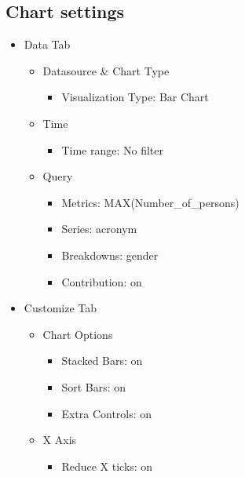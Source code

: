 \documentclass[
]{book}
\providecommand{\tightlist}{%
  \setlength{\itemsep}{0pt}\setlength{\parskip}{0pt}}
\begin{document}
\hypertarget{chart-settings-11}{%
\subsection{Chart settings}\label{chart-settings-11}}

\begin{itemize}
\item
  Data Tab

  \begin{itemize}
  \item
    Datasource \& Chart Type

    \begin{itemize}
    \tightlist
    \item
      Visualization Type: Bar Chart
    \end{itemize}
  \item
    Time

    \begin{itemize}
    \tightlist
    \item
      Time range: No filter
    \end{itemize}
  \item
    Query

    \begin{itemize}
    \item
      Metrics: MAX(Number\_of\_persons)
    \item
      Series: acronym
    \item
      Breakdowns: gender
    \item
      Contribution: on
    \end{itemize}
  \end{itemize}
\item
  Customize Tab

  \begin{itemize}
  \item
    Chart Options

    \begin{itemize}
    \item
      Stacked Bars: on
    \item
      Sort Bars: on
    \item
      Extra Controls: on
    \end{itemize}
  \item
    X Axis

    \begin{itemize}
    \tightlist
    \item
      Reduce X ticks: on
    \end{itemize}
  \end{itemize}
\end{itemize}
\end{document}
